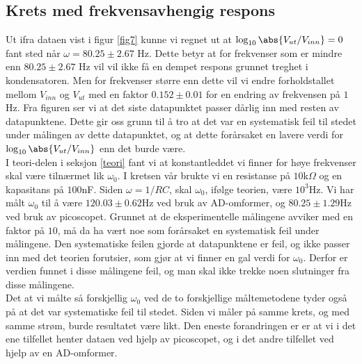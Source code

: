 \documentclass[%
 reprint,
 amsmath,amssymb,
 aps,
]{revtex4-1}
\begin{document}
\subsection{Krets med frekvensavhengig respons}
Ut ifra dataen vist i figur \ref{fig7} kunne vi regnet ut at $\log_{10} \abs{{V_{ut}/V_{inn}}} = 0$ fant sted når $\omega = 80.25 \pm 2.67$ Hz. Dette betyr at for frekvenser som er mindre enn $80.25 \pm 2.67$ Hz vil vil ikke få en dempet respons grunnet treghet i kondensatoren. Men for frekvenser større enn dette vil vi endre forholdstallet mellom $V_{inn}$ og $V_{ut}$ med en faktor $0.152 \pm 0.01$ for en endring av frekvensen på $1$ Hz. Fra figuren ser vi at det siste datapunktet passer dårlig inn med resten av datapunktene. Dette gir oss grunn til å tro at det var en systematisk feil til stedet under målingen av dette datapunktet, og at dette forårsaket en lavere verdi for $\log_{10} \abs{{V_{ut}/V_{inn}}}$
enn det burde være.  \\
I teori-delen i seksjon \ref{teori} fant vi at konstantleddet vi finner for høye frekvenser skal være tilnærmet lik $\omega_0$. I kretsen vår brukte vi en resistanse på $10$k$\Omega$ og en kapasitans på $100$nF. Siden $\omega = 1/RC$, skal $\omega_0$, ifølge teorien, være $10^3$Hz. Vi har målt $\omega_0$ til å være $120.03 \pm 0.62$Hz ved bruk av AD-omformer, og $ 80.25 \pm 1.29$Hz ved bruk av picoscopet. Grunnet at de eksperimentelle målingene avviker med en faktor på $10$, må da ha vært noe som forårsaket en systematisk feil under målingene. Den systematiske feilen gjorde at datapunktene er feil, og ikke passer inn med det teorien forutsier, som gjør at vi finner en gal verdi for $\omega_0$. Derfor er verdien funnet i disse målingene feil, og man skal ikke trekke noen slutninger fra disse målingene. \\
Det at vi målte så forskjellig $\omega_0$ ved de to forskjellige måltemetodene tyder også på at det var systematiske feil til stedet. Siden vi måler på samme krets, og med samme strøm, burde resultatet være likt. Den eneste forandringen er er at vi i det ene tilfellet henter dataen ved hjelp av picoscopet, og i det andre tilfellet ved hjelp av en AD-omformer.
\end{document}
